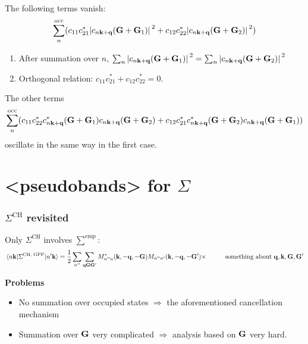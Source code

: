 \documentclass[t]{beamer}
\newcommand{\xmark}{\ding{55}}%
\newcommand{\shortcode}[1]{\texttt{#1}}
\def\\{}%
\def\texttt#1{<#1>}%
\begin{document}
\begin{frame}[allowframebreaks]
The following terms vanish:
\[
    \sum_n^{\text{occ}} (c_{11} c_{21}^* \abs*{c_{n \vb{k} + \vb{q}}(\vb{G} + \vb{G}_1)}^2 
    + c_{12} c_{22}^* \abs*{c_{n \vb{k} + \vb{q}}(\vb{G} + \vb{G}_2)}^2 )
\] 
\begin{enumerate}
    \item After summation over $n$, $\sum_n \abs*{c_{n \vb{k} + \vb{q}}(\vb{G} + \vb{G}_1)}^2  = \sum_n \abs*{c_{n \vb{k} + \vb{q}}(\vb{G} + \vb{G}_2)}^2 $
    \item Orthogonal relation: $c_{11} c_{21}^* + c_{12} c_{22}^* = 0.$
\end{enumerate}

The other terms 
\[
    \sum_n^{\text{occ}} (
        c_{11} c_{22}^* c_{n \vb{k} + \vb{q}}^*(\vb{G} + \vb{G}_1)  c_{n \vb{k} + \vb{q}}(\vb{G} + \vb{G}_2) + 
        c_{12} c_{21}^* c_{n \vb{k} + \vb{q}}^*(\vb{G} + \vb{G}_2) c_{n \vb{k} + \vb{q}}(\vb{G} + \vb{G}_1) 
    )
\]
oscillate in the same way in the first case.

\end{frame}


\section{\shortcode{pseudobands} for $\Sigma$}

\begin{frame}
\frametitle{$\Sigma^{\text{CH}}$ revisited}

Only $\Sigma^{\text{CH}}$ involves $\sum^{\text{emp}}$:
\begin{equation*}
    \begin{aligned}
        \mel*{n \vb{k}}{\Sigma^{\text{CH, GPP}}}{n' \vb{k}} 
        &= \frac{1}{2} \sum_{n''} \sum_{\vb{q} \vb{G} \vb{G}'} M_{n'' n}^*(\vb{k}, - \vb{q}, -\vb{G})
        M_{n'' n'}(\vb{k}, - \vb{q}, - \vb{G}') \times  \\
        &\quad \quad \text{something about $\vb{q}, \vb{k}, \vb{G}, \vb{G}'$}
    \end{aligned}
    \label{eq:ch.simple}
\end{equation*}

\textbf{Problems} \begin{itemize}
    \item No summation over occupied states $\Rightarrow$ 
    \xmark the aforementioned cancellation mechanism 
    \item Summation over $\vb{G}$ very complicated $\Rightarrow$
    analysis based on $\vb{G}$ very hard.
\end{itemize}

\end{frame}
\end{document}
